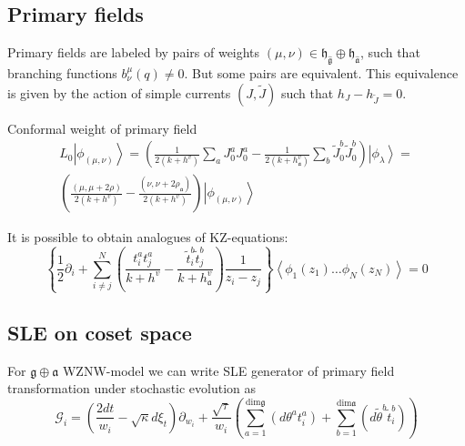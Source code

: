 \documentclass[12pt]{article}
\theoremstyle{definition}
\newcommand{\gf}{\mathfrak{g}}
\newcommand{\af}{\mathfrak{a}}
\newcommand{\hf}{\mathfrak{h}}
\newcommand{\gfh}{\hat{\mathfrak{g}}}
\newcommand{\afh}{\hat{\mathfrak{a}}}
\theoremstyle{definition} \newtheorem{Def}{Definition}
\begin{document}
\subsection{Primary fields}

Primary fields are labeled by pairs of weights $(\mu,\nu)\in \hf_{\gfh}\oplus \hf_{\afh}$, such that branching functions $b^{\mu}_{\nu}(q)\neq 0$. But some pairs are equivalent. This equivalence is given by the action of simple currents $(J,\tilde{J})$ such that $h_{J}-h_{\tilde{J}}=0$. 

Conformal weight of primary field
\begin{multline}
  L_0\left|\phi_{(\mu,\nu)}\right>=\left(\frac{1}{2(k+h^v)}\sum_aJ^a_0J^a_0-\frac{1}{2(k+h_{\af}^v)}\sum_b \tilde{J}^b_0 \tilde{J}^b_0 \right)
  \left|\phi_{\lambda}\right>=\\
  \left(\frac{(\mu,\mu+2\rho)}{2(k+h^v)}-\frac{(\nu,\nu+2\rho_{\af})}{2(k+h^v)}\right)\left|\phi_{(\mu,\nu)}\right>
\end{multline}


It is possible to obtain analogues of KZ-equations:
\begin{equation*}
  \left\{\frac{1}{2}\partial_{i} + \sum_{i\neq j}^{N}\left(\frac{t^{a}_{i}t^{a}_{j}}{k+h^{v}}-\frac{\tilde t^{b}_{i}\tilde t^{b}_{j}}{k+h^{v}_{\af}}\right)\frac{1}{z_{i}-z_{j}}\right\} \left<\phi_{1}(z_{1})\dots \phi_{N}(z_{N})\right>=0
\end{equation*}



\subsection{SLE on coset space}
For  $\gf\oplus \af$ WZNW-model we can write SLE generator of primary field transformation under stochastic evolution as
\begin{equation*}
  \mathcal{G}_{i}=\left(\frac{2dt}{w_{i}}-\sqrt{\kappa} d\xi_{t}\right) \partial_{w_{i}}+\frac{\sqrt{\tau}}{w_{i}}\left(\sum_{a=1}^{\mathrm{dim} \gf}\left(d \theta ^{a} t^{a}_{i}\right)+\sum_{b=1}^{\mathrm{dim} \af}\left(d \tilde{\theta} ^{b} \tilde{t}^{b}_{i}\right)\right)
\end{equation*}
\end{document}

